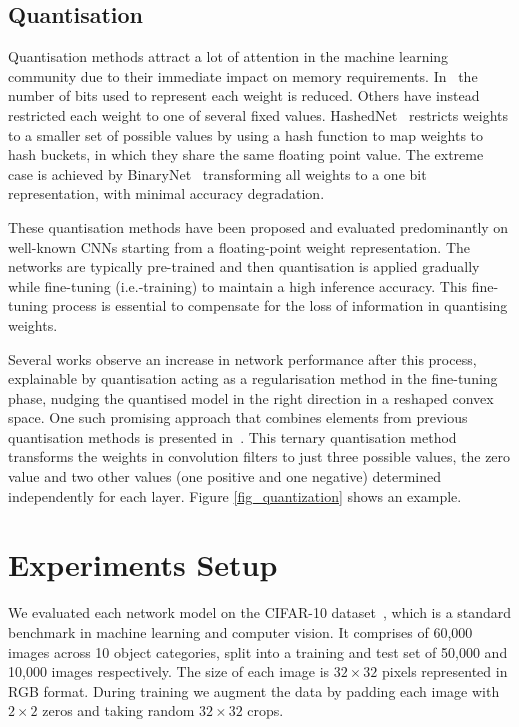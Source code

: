 \documentclass[conference]{IEEEtran}
\begin{document}
\subsection{Quantisation}Quantisation methods attract a lot of attention in the machine learning community due to their immediate impact on memory requirements. In~\cite{zhou_2017_incremental} the number of bits used to represent each weight is reduced. Others have instead restricted each weight to one of several fixed values. HashedNet~\cite{chen_2015_hashing} restricts weights to a smaller set of possible values by using a hash function to map weights to hash buckets, in which they share the same floating point value. The extreme case is achieved by BinaryNet~\cite{courbariaux_2015_binaryconnect} transforming all weights to a one bit representation, with minimal accuracy degradation. 

These quantisation methods have been proposed and evaluated predominantly on well-known CNNs starting from a floating-point weight representation. The networks are typically pre-trained and then quantisation is applied gradually while fine-tuning (i.e.\re-training) to maintain a high inference accuracy. This fine-tuning process is essential to compensate for the loss of information in quantising weights. 

Several works observe an increase in network performance after this process, explainable by quantisation acting as a regularisation method in the fine-tuning phase, nudging the quantised model in the right direction in a reshaped convex space. One such promising approach that combines elements from previous quantisation methods is presented in~\cite{zhu_2017_trained}. This ternary quantisation method transforms the weights in convolution filters to just three possible values, the zero value and two other values (one positive and one negative) determined independently for each layer. Figure \ref{fig_quantization} shows an example. %


\section{Experiments Setup}\label{sec:setup}%
We evaluated each network model on the CIFAR-10 dataset~\cite{cifar}, which is a standard benchmark in machine learning and computer vision. It comprises of 60,000 images across 10 object categories, split into a training and test set of 50,000 and 10,000 images respectively. The size of each image is $32\times32$ pixels represented in RGB format. During training we augment the data by padding each image with $2\times2$ zeros and taking random $32\times32$ crops.
\end{document}

